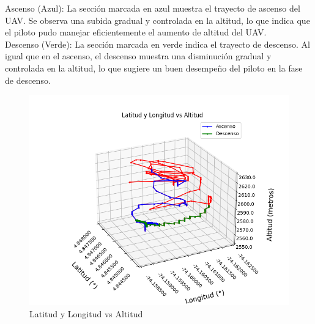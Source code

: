 Ascenso (Azul): La sección marcada en azul muestra el trayecto de ascenso del UAV. Se observa una subida gradual y controlada en la altitud, lo que indica que el piloto pudo manejar eficientemente el aumento de altitud del UAV.\\
Descenso (Verde): La sección marcada en verde indica el trayecto de descenso. Al igual que en el ascenso, el descenso muestra una disminución gradual y controlada en la altitud, lo que sugiere un buen desempeño del piloto en la fase de descenso.


\begin{figure}[H]
    \centering
    \includegraphics[width=\textwidth]{Imagenes/Vuelo/latitud y longitud acenso.png}
    \caption{Latitud y Longitud vs Altitud}
    \label{fig:GPS_altitud}
\end{figure}


